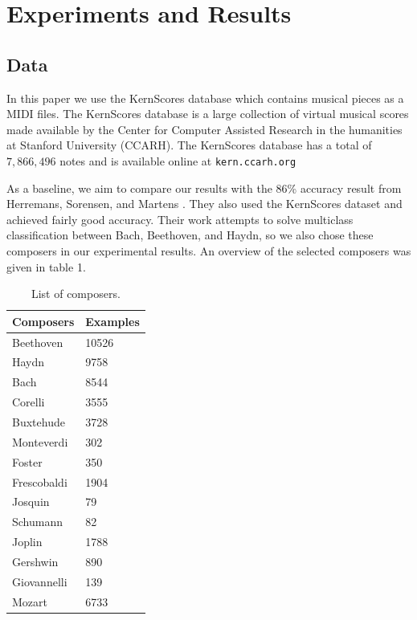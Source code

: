 \documentclass[11pt,a4paper]{article}
\begin{document}
\section{Experiments and Results}

\subsection{Data}
In this paper we use the KernScores database which contains musical pieces as a MIDI files. The KernScores database is a large collection of virtual musical scores made available by the Center for Computer Assisted Research in the humanities at Stanford University (CCARH). The KernScores database has a total of $7,866,496$ notes and is available online at \texttt{kern.ccarh.org} 

As a baseline, we aim to compare our results with the 86\% accuracy result from Herremans, Sorensen, and Martens \cite {Herremans}. They also used the KernScores dataset and achieved fairly good accuracy. Their work attempts to solve multiclass classification between Bach, Beethoven, and Haydn, so we also chose these composers in our experimental results. An overview of the selected composers was given in table 1.

\begin{table}[t!]
\begin{center}
\begin{tabular}{|l|l|}
\hline \bf Composers & \bf Examples \\ \hline
Beethoven & 10526 \\
Haydn & 9758 \\
Bach & 8544\\
Corelli & 3555\\
Buxtehude & 3728\\
Monteverdi & 302 \\
Foster & 350\\
Frescobaldi & 1904\\
Josquin & 79\\
Schumann & 82\\
Joplin & 1788\\
Gershwin & 890\\
Giovannelli & 139\\
Mozart & 6733  \\
\hline
\end{tabular}
\end{center}
\caption{\label{composer-table}List of composers. }
\end{table}
\end{document}

